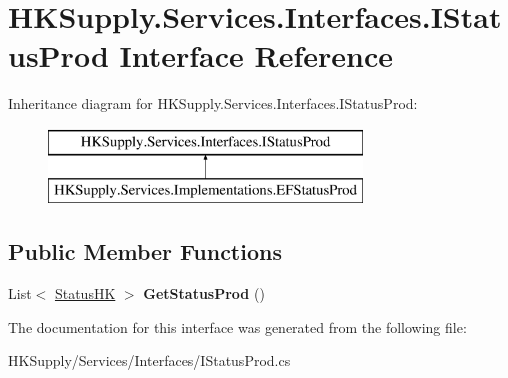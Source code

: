\hypertarget{interface_h_k_supply_1_1_services_1_1_interfaces_1_1_i_status_prod}{}\section{H\+K\+Supply.\+Services.\+Interfaces.\+I\+Status\+Prod Interface Reference}
\label{interface_h_k_supply_1_1_services_1_1_interfaces_1_1_i_status_prod}
Inheritance diagram for H\+K\+Supply.\+Services.\+Interfaces.\+I\+Status\+Prod\+:\begin{figure}[H]
\begin{center}
\leavevmode
\includegraphics[height=2.000000cm]{interface_h_k_supply_1_1_services_1_1_interfaces_1_1_i_status_prod}
\end{center}
\end{figure}
\subsection*{Public Member Functions}
\begin{DoxyCompactItemize}
\item 
\mbox{\label{interface_h_k_supply_1_1_services_1_1_interfaces_1_1_i_status_prod_a4b8db7006c0a0625c9f81ad2a7c81b28}} 
List$<$ \mbox{\hyperlink{class_h_k_supply_1_1_models_1_1_status_h_k}{Status\+HK}} $>$ {\bfseries Get\+Status\+Prod} ()
\end{DoxyCompactItemize}


The documentation for this interface was generated from the following file\+:\begin{DoxyCompactItemize}
\item 
H\+K\+Supply/\+Services/\+Interfaces/I\+Status\+Prod.\+cs\end{DoxyCompactItemize}
